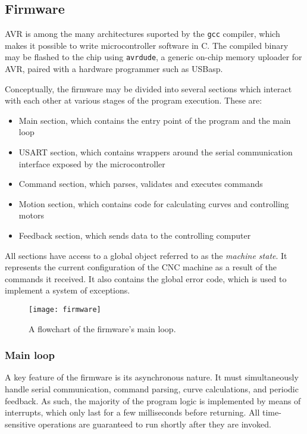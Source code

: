 \subsection{Firmware}

AVR is among the many architectures suported by the \texttt{gcc} compiler,
which makes it possible to write microcontroller software in C. The compiled
binary may be flashed to the chip using \texttt{avrdude}, a generic
on-chip memory uploader for AVR, paired with a hardware programmer such as
USBasp.

Conceptually, the firmware may be divided into several sections which interact
with each other at various stages of the program execution. These are:
\begin{itemize}
    \item Main section, which contains the entry point of the program and the
    main loop
    \item USART section, which contains wrappers around the serial communication
    interface exposed by the microcontroller
    \item Command section, which parses, validates and executes commands
    \item Motion section, which contains code for calculating curves and
    controlling motors
    \item Feedback section, which sends data to the controlling computer
\end{itemize}
All sections have access to a global object referred to as the \textit{machine
state}. It represents the current configuration of the CNC machine as a result
of the commands it received. It also contains the global error code, which is
used to implement a system of exceptions.

\begin{figure}[ht]
    \begin{center}
        \texttt{[image: firmware]}
        \caption{A flowchart of the firmware's main loop.}
        \label{firmware}
    \end{center}
\end{figure}

\subsubsection{Main loop}

A key feature of the firmware is its asynchronous nature. It must simultaneously
handle serial communication, command parsing, curve calculations, and periodic
feedback. As such, the majority of the program logic is implemented by means of
interrupts, which only last for a few milliseconds before returning. All
time-sensitive operations are guaranteed to run shortly after they are invoked.

